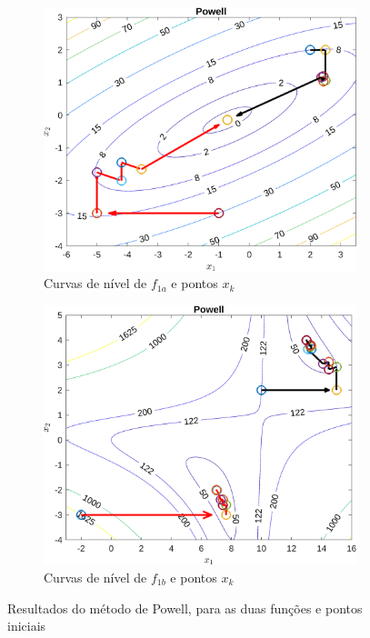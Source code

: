 \documentclass[10pt, a4paper]{article}
\begin{document}
\begin{figure}[H]
      \centering
      \begin{subfigure}{0.45\textwidth}
            \includegraphics[width=\textwidth]{img01A_m02.png}
            \caption{Curvas de n\'ivel de $f_{1a}$ e pontos $x_{k}$}
            \label{fig:graf01A_m02}
      \end{subfigure}
      \begin{subfigure}{0.45\textwidth}
            \centering
            \includegraphics[width=\textwidth]{img01B_m02.png}
            \caption{Curvas de n\'ivel de $f_{1b}$ e pontos $x_{k}$}
            \label{fig:graf01B_m02}
      \end{subfigure}
      \caption{Resultados do m\'etodo de Powell, para as duas fun\c c\~oes e pontos iniciais}
      \label{fig:graf01_m02}
\end{figure}
\end{document}
